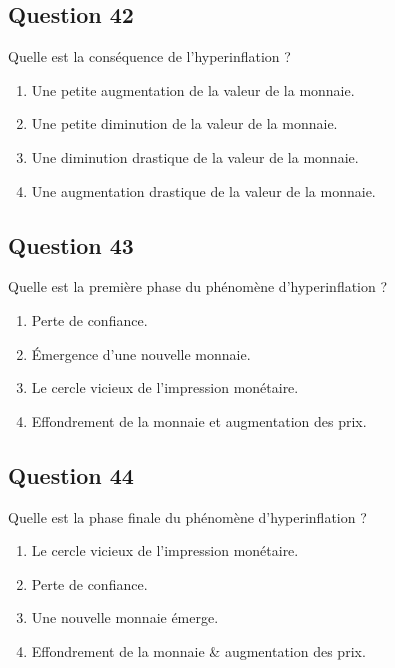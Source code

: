\documentclass[12pt,a4paper]{article}
\begin{document}
\bigskip


\subsection*{Question 42}
Quelle est la conséquence de l'hyperinflation ?

\begin{enumerate}[label=\Alph*., leftmargin=*]
\item Une petite augmentation de la valeur de la monnaie.
\item Une petite diminution de la valeur de la monnaie.
\item Une diminution drastique de la valeur de la monnaie.
\item Une augmentation drastique de la valeur de la monnaie.
\end{enumerate}

\bigskip


\subsection*{Question 43}
Quelle est la première phase du phénomène d'hyperinflation ?

\begin{enumerate}[label=\Alph*., leftmargin=*]
\item Perte de confiance.
\item Émergence d'une nouvelle monnaie.
\item Le cercle vicieux de l'impression monétaire.
\item Effondrement de la monnaie et augmentation des prix.
\end{enumerate}

\bigskip


\subsection*{Question 44}
Quelle est la phase finale du phénomène d'hyperinflation ?

\begin{enumerate}[label=\Alph*., leftmargin=*]
\item Le cercle vicieux de l'impression monétaire.
\item Perte de confiance.
\item Une nouvelle monnaie émerge.
\item Effondrement de la monnaie & augmentation des prix.
\end{enumerate}
\end{document}
